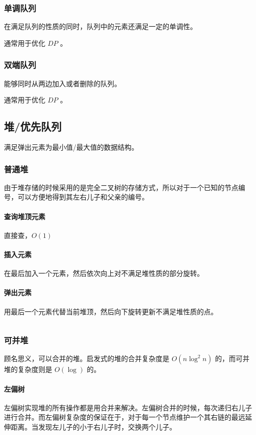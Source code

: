 \documentclass[UTF-8]{ctexart}
\newcommand{\cpp}[1]{\inputminted[bgcolor=bg,breaklines,breakanywhere=true]{c++}{#1}}
\begin{document}
			\subsubsection{单调队列}
			在满足队列的性质的同时，队列中的元素还满足一定的单调性。
	
			通常用于优化 $DP$ 。
			\subsubsection{双端队列}
			能够同时从两边加入或者删除的队列。
	
			通常用于优化 $DP$ 。
		\subsection{堆/优先队列}
		满足弹出元素为最小值/最大值的数据结构。
			\subsubsection{普通堆}
			由于堆存储的时候采用的是完全二叉树的存储方式，所以对于一个已知的节点编号，可以方便地得到其左右儿子和父亲的编号。
				\paragraph{查询堆顶元素} 直接查，$O(1)$
				\paragraph{插入元素} 在最后加入一个元素，然后依次向上对不满足堆性质的部分旋转。
				\paragraph{弹出元素} 用最后一个元素代替当前堆顶，然后向下旋转更新不满足堆性质的点。
			\cpp{code//DataStruct//heap.cpp}
			\subsubsection{可并堆}
			顾名思义，可以合并的堆。启发式的堆的合并复杂度是 $O(n\log^2n)$ 的，而可并堆的复杂度则是 $O(\log)$ 的。
	
				\paragraph{左偏树}	左偏树实现堆的所有操作都是用合并来解决。左偏树合并的时候，每次递归右儿子进行合并。而左偏树复杂度的保证在于，对于每一个节点维护一个其右链的最远延伸距离。当发现左儿子的小于右儿子时，交换两个儿子。
				\cpp{code//DataStruct//leftisttree.cpp}
				
\end{document}
